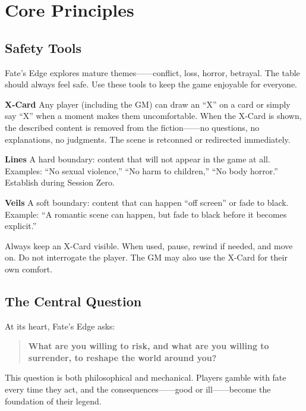 
\chapter{Core Principles}\label{chap:core_principles}

\section{Safety Tools}\label{sec:safety_tools}

Fate's Edge explores mature themes------conflict, loss, horror, betrayal. The table should always feel safe. Use these tools to keep the game enjoyable for everyone.

\begin{tcolorbox}[title=Safety Tools: Lines, Veils \& X-Card, colback=red!5!white, colframe=red!75!black, sharp corners,breakable]
\textbf{X-Card} Any player (including the GM) can draw an ``X'' on a card or simply say ``X'' when a moment makes them uncomfortable. When the X-Card is shown, the described content is removed from the fiction------no questions, no explanations, no judgments. The scene is retconned or redirected immediately.

\textbf{Lines} A hard boundary: content that will not appear in the game at all. Examples: ``No sexual violence,'' ``No harm to children,'' ``No body horror.'' Establish during Session Zero.

\textbf{Veils} A soft boundary: content that can happen ``off screen'' or fade to black. Example: ``A romantic scene can happen, but fade to black before it becomes explicit.''  
\end{tcolorbox}

Always keep an X-Card visible. When used, pause, rewind if needed, and move on. Do not interrogate the player. The GM may also use the X-Card for their own comfort.

\section{The Central Question}\label{sec:central_question}

At its heart, Fate's Edge asks:
\begin{quote}
\textbf{What are you willing to risk, and what are you willing to surrender, to reshape the world around you?}
\end{quote}
This question is both philosophical and mechanical. Players gamble with fate every time they act, and the consequences------good or ill------become the foundation of their legend.

